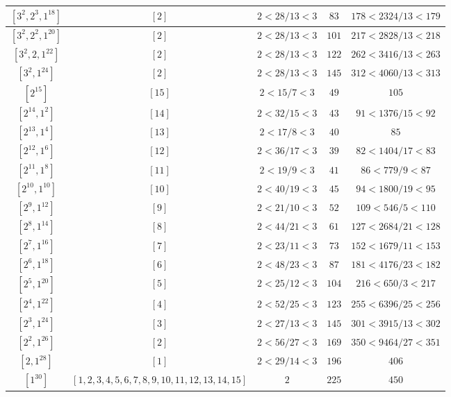 \documentclass{article}%
\begin{document}
\begin{center}
\begin{longtable}{||c|c|c|c|c||}
$[3^{2}, 2^{3}, 1^{18}]$ & $[2]$ & $2 < 28/13 < 3$ & $83$ & $178 < 2324/13 < 179$ \\ \hline 
$[3^{2}, 2^{2}, 1^{20}]$ & $[2]$ & $2 < 28/13 < 3$ & $101$ & $217 < 2828/13 < 218$ \\ \hline 
$[3^{2}, 2, 1^{22}]$ & $[2]$ & $2 < 28/13 < 3$ & $122$ & $262 < 3416/13 < 263$ \\ \hline 
$[3^{2}, 1^{24}]$ & $[2]$ & $2 < 28/13 < 3$ & $145$ & $312 < 4060/13 < 313$ \\ \hline 
$[2^{15}]$ & $[15]$ & $2 < 15/7 < 3$ & $49$ & $105$ \\ \hline 
$[2^{14}, 1^{2}]$ & $[14]$ & $2 < 32/15 < 3$ & $43$ & $91 < 1376/15 < 92$ \\ \hline 
$[2^{13}, 1^{4}]$ & $[13]$ & $2 < 17/8 < 3$ & $40$ & $85$ \\ \hline 
$[2^{12}, 1^{6}]$ & $[12]$ & $2 < 36/17 < 3$ & $39$ & $82 < 1404/17 < 83$ \\ \hline 
$[2^{11}, 1^{8}]$ & $[11]$ & $2 < 19/9 < 3$ & $41$ & $86 < 779/9 < 87$ \\ \hline 
$[2^{10}, 1^{10}]$ & $[10]$ & $2 < 40/19 < 3$ & $45$ & $94 < 1800/19 < 95$ \\ \hline 
$[2^{9}, 1^{12}]$ & $[9]$ & $2 < 21/10 < 3$ & $52$ & $109 < 546/5 < 110$ \\ \hline 
$[2^{8}, 1^{14}]$ & $[8]$ & $2 < 44/21 < 3$ & $61$ & $127 < 2684/21 < 128$ \\ \hline 
$[2^{7}, 1^{16}]$ & $[7]$ & $2 < 23/11 < 3$ & $73$ & $152 < 1679/11 < 153$ \\ \hline 
$[2^{6}, 1^{18}]$ & $[6]$ & $2 < 48/23 < 3$ & $87$ & $181 < 4176/23 < 182$ \\ \hline 
$[2^{5}, 1^{20}]$ & $[5]$ & $2 < 25/12 < 3$ & $104$ & $216 < 650/3 < 217$ \\ \hline 
$[2^{4}, 1^{22}]$ & $[4]$ & $2 < 52/25 < 3$ & $123$ & $255 < 6396/25 < 256$ \\ \hline 
$[2^{3}, 1^{24}]$ & $[3]$ & $2 < 27/13 < 3$ & $145$ & $301 < 3915/13 < 302$ \\ \hline 
$[2^{2}, 1^{26}]$ & $[2]$ & $2 < 56/27 < 3$ & $169$ & $350 < 9464/27 < 351$ \\ \hline 
$[2, 1^{28}]$ & $[1]$ & $2 < 29/14 < 3$ & $196$ & $406$ \\ \hline 
$[1^{30}]$ & $[1, 2, 3, 4, 5, 6, 7, 8, 9, 10, 11, 12, 13, 14, 15]$ & $2$ & $225$ & $450$ \\ \hline 
    \end{longtable}
    \end{center}
\newpage

%
\end{document}
